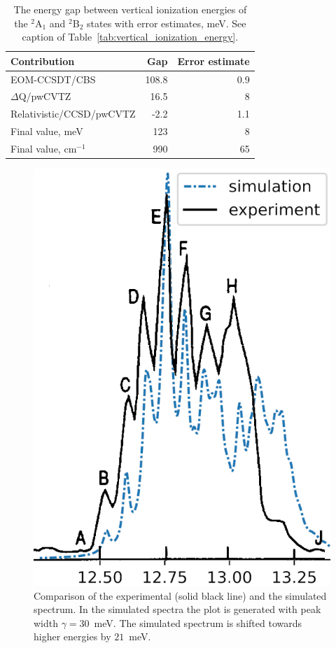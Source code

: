 \documentclass[12pt,pra,aps,superscriptaddress]{revtex4-2}
\begin{document}
\begin{table}
    \caption{
        The energy gap between vertical ionization energies of the $^2$A$_1$
        and $^2$B$_2$ states with error estimates, meV. See caption of
        Table~\ref{tab:vertical_ionization_energy}.
    }
    \label{tab:vertical_gap}
    \begin{center}
        \begin{tabular}[c]{|l|r|r|}
            \hline
            Contribution             &  Gap    & Error estimate \\ \hline
            EOM-CCSDT/CBS            &  108.8  & 0.9 \\
            $\Delta$Q/pwCVTZ         &   16.5  & 8 \\
            Relativistic/CCSD/pwCVTZ &   -2.2  & 1.1 \\ \hline
            Final value, meV         &  123    & 8 \\
            Final value, cm$^{-1}$   &  990    & 65 \\ \hline
        \end{tabular}
    \end{center}
\end{table}

\begin{figure}
\includegraphics[width = 8 cm]{figures/sim_vs_Dyke}
\caption{
    Comparison of the experimental (solid black line) and the simulated
    spectrum. In the simulated spectra the plot is generated with peak width
    $\gamma = 30$~meV. The simulated spectrum is shifted towards higher
    energies by $21$~meV.
}
\label{fig:sim_vs_dyke}
\end{figure}
\end{document}
